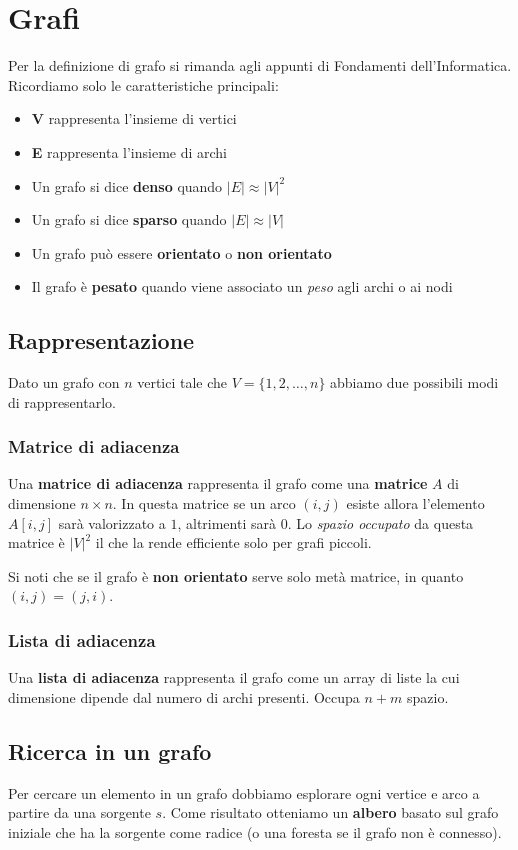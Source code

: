 \newpage
\section{Grafi}
Per la definizione di grafo si rimanda agli appunti di Fondamenti dell'Informatica. Ricordiamo solo le caratteristiche principali:
\begin{itemize}
	\item \textbf{V} rappresenta l'insieme di vertici
	\item \textbf{E} rappresenta l'insieme di archi
	\item Un grafo si dice \textbf{denso} quando $\lvert E \rvert \approx \lvert V \rvert^2$
	\item Un grafo si dice \textbf{sparso} quando $\lvert E \rvert \approx \lvert V \rvert$
	\item Un grafo può essere \textbf{orientato} o \textbf{non orientato}
	\item Il grafo è \textbf{pesato} quando viene associato un \emph{peso} agli archi o ai nodi
\end{itemize}
\subsection{Rappresentazione}
Dato un grafo con $n$ vertici tale che $V = \{1, 2, \ldots, n\}$ abbiamo due possibili modi di rappresentarlo.
\subsubsection{Matrice di adiacenza}
Una \textbf{matrice di adiacenza} rappresenta il grafo come una \textbf{matrice} $A$ di dimensione $n \times n$.  In questa matrice se un arco $(i, j)$ esiste allora l'elemento $A[i, j]$ sarà valorizzato a $1$, altrimenti sarà $0$. Lo \emph{spazio occupato} da questa matrice è $\lvert V \rvert ^2$ il che la rende efficiente solo per grafi piccoli.
\begin{note}
	Si noti che se il grafo è \textbf{non orientato} serve solo metà matrice, in quanto $(i, j) = (j, i)$.
\end{note}
\subsubsection{Lista di adiacenza}
Una \textbf{lista di adiacenza} rappresenta il grafo come un array di liste la cui dimensione dipende dal numero di archi presenti. Occupa $n+m$ spazio.

\subsection{Ricerca in un grafo}
Per cercare un elemento in un grafo dobbiamo esplorare ogni vertice e arco a partire da una sorgente $s$. Come risultato otteniamo un \textbf{albero} basato sul grafo iniziale che ha la sorgente come radice (o una foresta se il grafo non è connesso).

